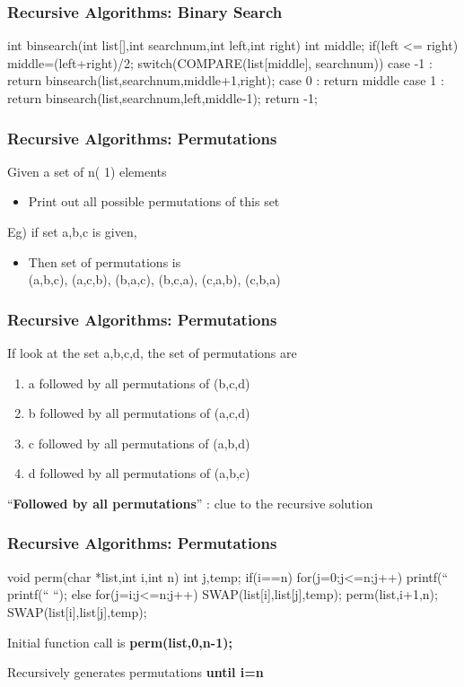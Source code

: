 \documentclass[newPxFont,sthlmFooter,nooffset]{beamer}
\begin{document}
\begin{frame}[t, fragile]
  \frametitle{Recursive Algorithms: Binary Search}
\begin{codedef}
int binsearch(int list[],int searchnum,int left,int right) {
   int middle;
   if(left <= right) {
      middle=(left+right)/2; 
      switch(COMPARE(list[middle], searchnum)) { 
         case -1 : return
            binsearch(list,searchnum,middle+1,right); 
         case 0 : return middle
         case 1 : return
            binsearch(list,searchnum,left,middle-1); 
      }
   }
   return -1; 
}    
\end{codedef}
\end{frame}

\begin{frame}[t]
  \frametitle{Recursive Algorithms: Permutations}
Given a set of n( 1) elements 
\begin{itemize}
\item Print out all possible permutations of this set
\end{itemize}


Eg) if set {a,b,c} is given,
\begin{itemize}
\item Then set of permutations is \\
      {(a,b,c), (a,c,b), (b,a,c), (b,c,a),
    (c,a,b), (c,b,a)}
\end{itemize}

\end{frame}

\begin{frame}[t]
  \frametitle{Recursive Algorithms: Permutations}
If look at the set {a,b,c,d}, the set of permutations are

\begin{enumerate}
\item a followed by all permutations of (b,c,d)
\item b followed by all permutations of (a,c,d)
\item c followed by all permutations of (a,b,d)
\item d followed by all permutations of (a,b,c)
\end{enumerate}

``\textbf{Followed by all permutations}'' : clue to the recursive solution
\end{frame}
\begin{frame}[t, fragile]
  \frametitle{Recursive Algorithms: Permutations}
\begin{codedef}
void perm(char *list,int i,int n) {
	int j,temp;
	if(i==n) {
		for(j=0;j<=n;j++)
		printf(“%
		printf(“     “);
	}
	else {
		for(j=i;j<=n;j++) {
			SWAP(list[i],list[j],temp);
			perm(list,i+1,n);
			SWAP(list[i],list[j],temp);
		}
	}  
}  
\end{codedef}
Initial function call is \textbf{perm(list,0,n-1);}
 	
Recursively generates permutations \textbf{until i=n}
 	
\end{frame}
\end{document}
